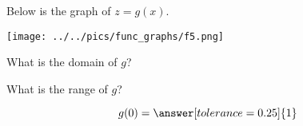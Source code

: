 \documentclass{ximera}
\author{Lee Wayand}
\begin{document}
\begin{exercise}  





Below is the graph of $z=g(x)$.  

\begin{image}
\texttt{[image: ../../pics/func\_graphs/f5.png]}
\end{image}









\begin{question} 


What is the domain of $g$?\\


\begin{multipleChoice}
\choice {$[-4, 4]$}
\end{multipleChoice}

\end{question}






\begin{question} 


What is the range of $g$?\\


\begin{multipleChoice}
\choice {$[-4, 4]$}
\end{multipleChoice}


\end{question}









\begin{question} 



\[  g(0) = \answer[tolerance=0.25]{1}  \]

\end{question}











\end{exercise}
\end{document}
